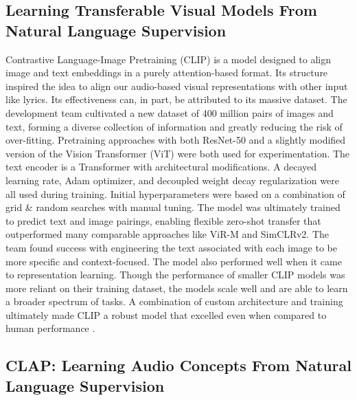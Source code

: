 \subsection{Learning Transferable Visual Models From Natural Language Supervision}

Contrastive Language-Image Pretraining (CLIP) is a model designed to align image and text embeddings in a purely attention-based format. Its structure inspired the idea to align our audio-based visual representations with other input like lyrics. Its effectiveness can, in part, be attributed to its massive dataset. The development team cultivated a new dataset of 400 million pairs of images and text, forming a diverse collection of information and greatly reducing the risk of over-fitting. Pretraining approaches with both ResNet-50 and a slightly modified version of the Vision Transformer (ViT) were both used for experimentation. The text encoder is a Transformer with architectural modifications. A decayed learning rate, Adam optimizer, and decoupled weight decay regularization were all used during training. Initial hyperparameters were based on a combination of grid \& random searches with manual tuning. The model was ultimately trained to predict text and image pairings, enabling flexible zero-shot transfer that outperformed many comparable approaches like ViR-M and SimCLRv2. The team found success with engineering the text associated with each image to be more specific and context-focused. The model also performed well when it came to representation learning. Though the performance of smaller CLIP models was more reliant on their training dataset, the models scale well and are able to learn a broader spectrum of tasks. A combination of custom architecture and training ultimately made CLIP a robust model that excelled even when compared to human performance \cite{CLIP}.

\subsection{CLAP: Learning Audio Concepts From Natural Language Supervision}

